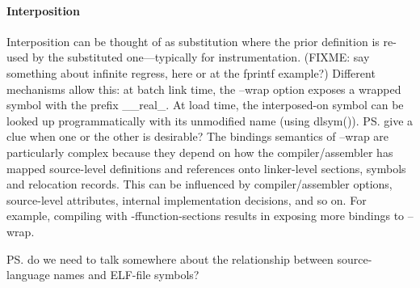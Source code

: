 \paragraph{Interposition}
Interposition can be thought of as substitution where the prior definition
is re-used by the substituted one---typically for instrumentation.
(FIXME: say something about infinite regress, here or at the fprintf example?)
Different mechanisms allow this:
at batch link time, the \textsf{--wrap} option exposes a wrapped symbol
with the prefix \textsf{\_\_real\_}. 
At load time, the interposed-on symbol can be looked up programmatically with its unmodified name 
(using \textsf{dlsym()}).
\ps{give a clue when one or the other is desirable?}
The bindings semantics of \textsf{--wrap} are particularly complex
because they depend on how the compiler/assembler has mapped source-level definitions and references
onto linker-level sections, symbols and relocation records.
This can be influenced by compiler/assembler options, 
source-level attributes, internal implementation decisions, and so on.
For example, compiling with \textsf{-ffunction-sections} results in exposing
more bindings to \textsf{--wrap}.

\ps{do we need to talk somewhere about the relationship between
  source-language names and ELF-file symbols?}



% 



